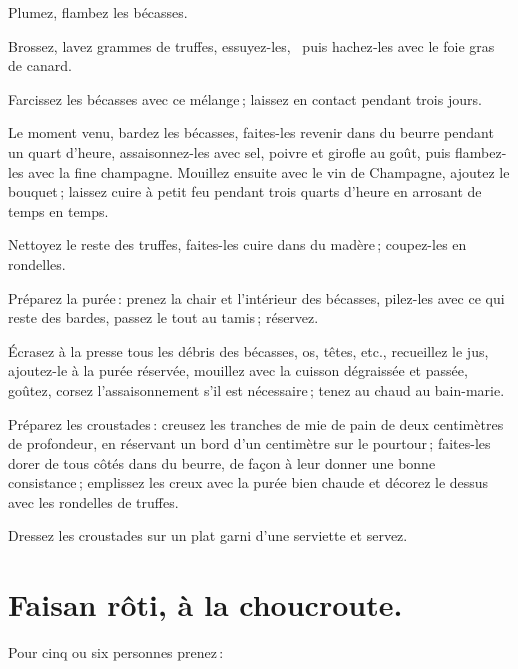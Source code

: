 Plumez, flambez les bécasses.

Brossez, lavez {\mmm} grammes de truffes, essuyez-les,  puis hachez‑les
avec le foie gras de canard.

Farcissez les bécasses avec ce mélange ; laissez en contact pendant trois
jours.

Le moment venu, bardez les bécasses, faites-les revenir dans du beurre pendant
un quart d'heure, assaisonnez-les avec sel, poivre et girofle au goût, puis
flambez-les avec la fine champagne. Mouillez ensuite avec le vin de Champagne,
ajoutez le bouquet ; laissez cuire à petit feu pendant trois quarts d'heure en
arrosant de temps en temps.

Nettoyez le reste des truffes, faites-les cuire dans du madère ; coupez-les en
rondelles.

Préparez la purée : prenez la chair et l'intérieur des bécasses, pilez-les avec
ce qui reste des bardes, passez le tout au tamis ; réservez.

Écrasez à la presse tous les débris des bécasses, os, têtes, etc., recueillez le jus,
ajoutez-le à la purée réservée, mouillez avec la cuisson dégraissée et passée, goûtez,
corsez l'assaisonnement s'il est nécessaire ; tenez au chaud au bain-marie.

Préparez les croustades : creusez les tranches de mie de pain de deux
centimètres de profondeur, en réservant un bord d'un centimètre sur le
pourtour ; faites-les dorer de tous côtés dans du beurre, de façon à leur
donner une bonne consistance ; emplissez les creux avec la purée bien chaude et
décorez le dessus avec les rondelles de truffes.

Dressez les croustades sur un plat garni d'une serviette et servez.

\section*{\centering Faisan rôti, à la choucroute.}
{}

Pour cinq ou six personnes prenez :

